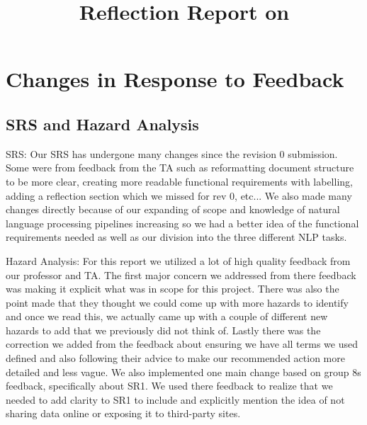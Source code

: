 \documentclass{article}
\title{Reflection Report on \progname}
\author{\authname}
\date{}
\begin{document}
\maketitle


\section{Changes in Response to Feedback}



\subsection{SRS and Hazard Analysis}
   \item SRS:
   Our SRS has undergone many changes since the revision 0 submission. Some were from feedback from the TA such as reformatting document structure to be more clear, creating more readable functional requirements with labelling, adding a reflection section which we missed for rev 0, etc... We also made many changes directly because of our expanding of scope and knowledge of natural language processing pipelines increasing so we had a better idea of the functional requirements needed as well as our division into the three different NLP tasks.
   \item Hazard Analysis:
       For this report we utilized a lot of high quality feedback from our professor and TA. The first major concern we
       addressed from there feedback was making it explicit what was in scope for this project. There was also the point
       made that they thought we could come up with more hazards to identify and once we read this, we actually came up
       with a couple of different new hazards to add that we previously did not think of. Lastly there was the correction
       we added from the feedback about ensuring we have all terms we used defined and also following their advice to make
       our recommended action more detailed and less vague. We also implemented one main change based on group 8s feedback,
       specifically about SR1. We used there feedback to realize that we needed to add clarity to SR1 to include and explicitly
       mention the idea of not sharing data online or exposing it to third-party sites.
\end{document}
